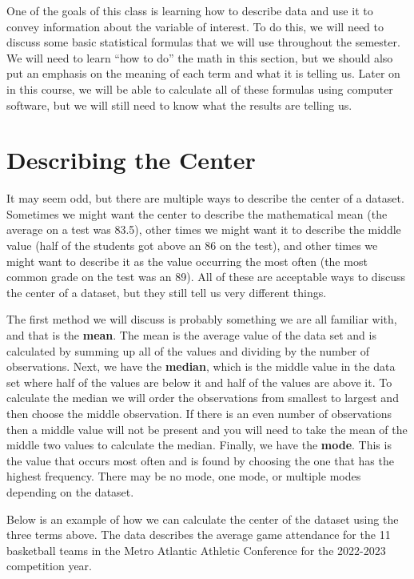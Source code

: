 \documentclass[
  letterpaper,
  DIV=11,
  numbers=noendperiod]{scrreprt}
\begin{document}
One of the goals of this class is learning how to describe data and use
it to convey information about the variable of interest. To do this, we
will need to discuss some basic statistical formulas that we will use
throughout the semester. We will need to learn ``how to do'' the math in
this section, but we should also put an emphasis on the meaning of each
term and what it is telling us. Later on in this course, we will be able
to calculate all of these formulas using computer software, but we will
still need to know what the results are telling us.

\section{Describing the Center}\label{describing-the-center}

It may seem odd, but there are multiple ways to describe the center of a
dataset. Sometimes we might want the center to describe the mathematical
mean (the average on a test was 83.5), other times we might want it to
describe the middle value (half of the students got above an 86 on the
test), and other times we might want to describe it as the value
occurring the most often (the most common grade on the test was an 89).
All of these are acceptable ways to discuss the center of a dataset, but
they still tell us very different things.

The first method we will discuss is probably something we are all
familiar with, and that is the \textbf{mean}. The mean is the average
value of the data set and is calculated by summing up all of the values
and dividing by the number of observations. Next, we have the
\textbf{median}, which is the middle value in the data set where half of
the values are below it and half of the values are above it. To
calculate the median we will order the observations from smallest to
largest and then choose the middle observation. If there is an even
number of observations then a middle value will not be present and you
will need to take the mean of the middle two values to calculate the
median. Finally, we have the \textbf{mode}. This is the value that
occurs most often and is found by choosing the one that has the highest
frequency. There may be no mode, one mode, or multiple modes depending
on the dataset.

Below is an example of how we can calculate the center of the dataset
using the three terms above. The data describes the average game
attendance for the 11 basketball teams in the Metro Atlantic Athletic
Conference for the 2022-2023 competition year.
\end{document}
